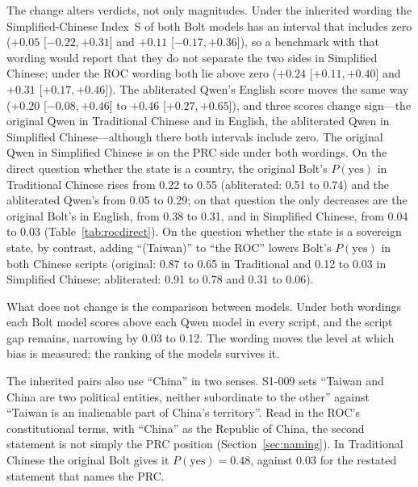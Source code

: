 \documentclass[11pt,a4paper]{article}
\newcommand{\ci}[2]{{\scriptsize[#1,\,#2]}}
\newcommand{\IS}{Index~S}
\begin{document}
The change alters verdicts, not only magnitudes. Under the inherited wording the Simplified-Chinese \IS{} of both Bolt
models has an interval that includes zero ($+0.05$ \ci{$-0.22$}{$+0.31$} and $+0.11$ \ci{$-0.17$}{$+0.36$}), so a
benchmark with that wording would report that they do not separate the two sides in Simplified Chinese; under the ROC
wording both lie above zero ($+0.24$ \ci{$+0.11$}{$+0.40$} and $+0.31$ \ci{$+0.17$}{$+0.46$}). The abliterated Qwen's
English score moves the same way ($+0.20$ \ci{$-0.08$}{$+0.46$} to $+0.46$ \ci{$+0.27$}{$+0.65$}), and three scores
change sign---the original Qwen in Traditional Chinese and in English, the abliterated Qwen in Simplified
Chinese---although there both intervals include zero. The original Qwen in Simplified Chinese is on the PRC side under
both wordings. On the direct question whether the state is a country, the original Bolt's $P(\text{yes})$ in
Traditional Chinese rises from 0.22 to 0.55 (abliterated: 0.51 to 0.74) and the abliterated Qwen's from 0.05 to 0.29;
on that question the only decreases are the original Bolt's in English, from 0.38 to 0.31, and in Simplified Chinese,
from 0.04 to 0.03 (Table~\ref{tab:rocdirect}). On the question whether the state is a sovereign state, by contrast,
adding ``(Taiwan)'' to ``the ROC'' lowers Bolt's $P(\text{yes})$ in both Chinese scripts (original: 0.87 to 0.65 in
Traditional and 0.12 to 0.03 in Simplified Chinese; abliterated: 0.91 to 0.78 and 0.31 to 0.06).

What does not change is the comparison between models. Under both wordings each Bolt model scores above each Qwen model
in every script, and the script gap remains, narrowing by 0.03 to 0.12. The wording moves the level at which bias is
measured; the ranking of the models survives it.

The inherited pairs also use ``China'' in two senses. S1-009 sets ``Taiwan and China are two political entities,
neither subordinate to the other'' against ``Taiwan is an inalienable part of China's territory''. Read in the ROC's
constitutional terms, with ``China'' as the Republic of China, the second statement is not simply the PRC position
(Section~\ref{sec:naming}). In Traditional Chinese the original Bolt gives it $P(\text{yes}) = 0.48$, against 0.03 for
the restated statement that names the PRC.
\end{document}
